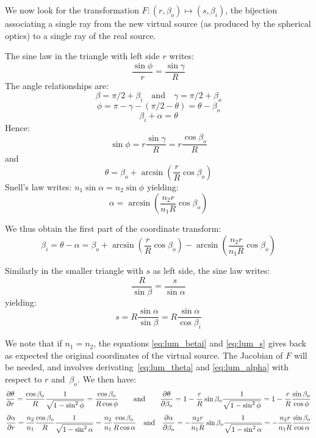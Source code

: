 We now look for the transformation $F: (r, \beta_o) \mapsto (s, \beta_i)$, the bijection
associating a single ray from the new virtual source (as produced by the spherical optics)
 to a single ray of the real source.

The sine law in the triangle with left side $r$ writes:
\[ \frac{\sin\phi}{r} = \frac{\sin\gamma}{R}\]
The angle relationships are:
\[ \beta = \pi/2+\beta_i  \quad\textrm{and}\quad  \gamma = \pi/2 + \beta_o\]
\[ \phi = \pi - \gamma - (\pi/2 -\theta) = \theta - \beta_o \]
\[\beta_i + \alpha = \theta \]
Hence:
\[ \sin\phi = r\frac{\sin\gamma}{R} = r \frac{\cos\beta_o}{R} \]
and
\begin{equation}  
 \theta = \beta_o + \arcsin\left( \frac{r}{R}\cos\beta_o\right)
 \label{eq:lum_theta}
\end{equation}
Snell's law writes: $n_1 \sin\alpha = n_2\sin\phi$ yielding:
\begin{equation}  
\alpha = \arcsin\left( \frac{n_2 r}{n_1 R}\cos\beta_o \right)
 \label{eq:lum_alpha}
\end{equation}

We thus obtain the first part of the coordinate transform:
\begin{equation}
\beta_i = \theta-\alpha = \beta_o + \arcsin\left( \frac{r}{R}\cos\beta_o\right)
                         - \arcsin\left( \frac{n_2 r}{n_1 R}\cos\beta_o \right)
\label{eq:lum_betai}
\end{equation}

Similarly in the smaller triangle with $s$ as left side, the sine law writes:
\[  \frac{R}{\sin\beta} = \frac{s}{\sin\alpha} \]
yielding:
\begin{equation}
 s = R\frac{\sin\alpha}{\sin\beta} = R\frac{\sin\alpha}{\cos\beta_i}
 \label{eq:lum_s}
\end{equation}

We note that if $n_1=n_2$, the equations \eqref{eq:lum_betai} and \eqref{eq:lum_s} 
gives back as expected the original coordinates of the virtual source.
 The Jacobian of $F$ will be needed, and involves derivating~\eqref{eq:lum_theta} and
\eqref{eq:lum_alpha} with respect to $r$ and~$\beta_o$.
We then have:
\[
\frac{\partial{\theta}}{\partial{r}}  = \frac{\cos\beta_o}{R} \frac{1}{\sqrt{1-\sin^2\phi}}
      =  \frac{\cos\beta_o}{R \cos\phi}
 \quad  \quad \textrm{and} \quad  \quad 
\frac{\partial{\theta}}{\partial{\beta_o}}  =  1- \frac{r}{R}\sin\beta_o \frac{1}{\sqrt{1-\sin^2\phi}}
        =  1- \frac{r}{R} \frac{\sin\beta_o}{\cos\phi} \\        
\] \[
\frac{\partial{\alpha}}{\partial{r}}  = \frac{n_2}{n_1}\frac{\cos\beta_o}{R}\frac{1}{\sqrt{1-\sin^2\alpha}}
        = \frac{n_2}{n_1}\frac{\cos\beta_o}{R\cos\alpha}
 \quad \textrm{and} \quad
\frac{\partial{\alpha}}{\partial{\beta_o}} = -\frac{n_2 r}{n_1 R}\sin\beta_o\frac{1}{\sqrt{1-\sin^2\alpha}}
        =  -\frac{n_2 r}{n_1 R}\frac{\sin\beta_o}{\cos\alpha}
\]

